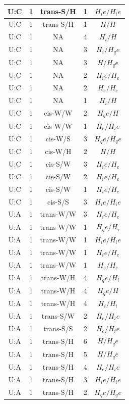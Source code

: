 \begin{center}
\begin{longtable}{c|c|c|c|c}
U:C & 1 & trans-S/H & 1 & $H_ie/H_ie$ \\  \hline
U:C & 1 & trans-S/H & 1 & $H/H$ \\  \hline
U:C & 1 & NA & 4 & $H_i/H$ \\  \hline
U:C & 1 & NA & 3 & $H_i/H_qe$ \\  \hline
U:C & 1 & NA & 3 & $H/H_qe$ \\  \hline
U:C & 1 & NA & 2 & $H_ie/H_e$ \\  \hline
U:C & 1 & NA & 2 & $H_e/H_e$ \\  \hline
U:C & 1 & NA & 1 & $H_i/H$ \\  \hline
U:C & 1 & cis-W/W & 2 & $H_qe/H$ \\  \hline
U:C & 1 & cis-W/W & 1 & $H_e/H_ie$ \\  \hline
U:C & 1 & cis-W/S & 3 & $H_qe/H_qe$ \\  \hline
U:C & 1 & cis-W/H & 2 & $H/H$ \\  \hline
U:C & 1 & cis-S/W & 3 & $H_ie/H_e$ \\  \hline
U:C & 1 & cis-S/W & 2 & $H_ie/H_e$ \\  \hline
U:C & 1 & cis-S/W & 1 & $H_ie/H_e$ \\  \hline
U:C & 1 & cis-S/S & 3 & $H_ie/H_ie$ \\  \hline
U:A & 1 & trans-W/W & 3 & $H_ie/H_e$ \\  \hline
U:A & 1 & trans-W/W & 1 & $H_qe/H_i$ \\  \hline
U:A & 1 & trans-W/W & 1 & $H_ie/H_ie$ \\  \hline
U:A & 1 & trans-W/W & 1 & $H_ie/H_e$ \\  \hline
U:A & 1 & trans-W/W & 1 & $H_e/H_e$ \\  \hline
U:A & 1 & trans-W/H & 4 & $H_qe/H_i$ \\  \hline
U:A & 1 & trans-W/H & 4 & $H_qe/H$ \\  \hline
U:A & 1 & trans-W/H & 4 & $H_i/H_i$ \\  \hline
U:A & 1 & trans-S/W & 2 & $H_e/H_ie$ \\  \hline
U:A & 1 & trans-S/S & 2 & $H_e/H_ie$ \\  \hline
U:A & 1 & trans-S/H & 6 & $H/H_qe$ \\  \hline
U:A & 1 & trans-S/H & 5 & $H/H_qe$ \\  \hline
U:A & 1 & trans-S/H & 4 & $H_e/H_ie$ \\  \hline
U:A & 1 & trans-S/H & 3 & $H_ie/H_ie$ \\  \hline
U:A & 1 & trans-S/H & 2 & $H_qe/H_qe$ \\  \hline

\end{longtable}
\end{center}
